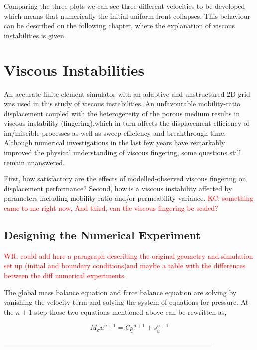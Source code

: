 \documentclass[preprint,authoryear,12pt]{elsarticle}
\begin{document}
Comparing the three plots we can see three different velocities to be developed which means that numerically the initial uniform front collapses. This behaviour can be described on the following chapter, where the explanation of viscous instabilities is given.         
  

\section{Viscous Instabilities}\label{section:ViscousInstabilities}

An accurate finite-element simulator with an adaptive and unstructured 2D grid was used in this study of viscous instabilities. An unfavourable mobility-ratio displacement coupled with the heterogeneity of the porous medium results in viscous instability (fingering),which in turn affects the displacement efficiency of im/miscible processes as well as sweep efficiency and breakthrough time. Although numerical investigations in the last few years have remarkably improved the physical understanding of viscous fingering, some questions still remain unanswered.
 
First, how satisfactory are the effects of modelled-observed viscous fingering on displacement performance? Second, how is a viscous instability affected by parameters including mobility ratio and/or permeability variance. \textcolor{red}{ KC: something came to me right now, And third, can the viscous fingering be scaled?}  

\subsection{Designing the Numerical Experiment}\label{section:NumericalExperiment}
\textcolor{red}{WR: could add here a paragraph describing the original geometry and simulation set up (initial and boundary conditions)and maybe a table with the differences between the diff numerical experiments.}

The global mass balance equation and force balance equation are solving by vanishing the velocity term and solving the system of equations for pressure. At the $n+1$ step those two equations mentioned above can be rewritten as, 

\begin{equation}
M_{\sigma} {{\underline{u}}^{n+1}} = C {\underline{p}^{n+1}} + {\underline{s}_u ^{n+1}}
\label{mass balance eq}
\end{equation}

-------------------------------------------------------------------------------------------
\end{document}
